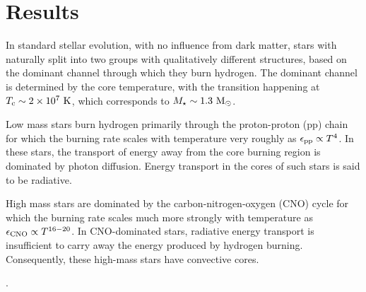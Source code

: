 \documentclass[useAMS,usenatbib]{mnras}
\begin{document}

  
  


\section{Results}
\label{sec:results}

In standard stellar evolution, with no influence from dark matter, stars with \mrange naturally split into two groups with qualitatively different structures, based on the dominant channel through which they burn hydrogen. The dominant channel is determined by the core temperature, with the transition happening at $T_\mathrm{c} \sim 2 \times 10^7 \ \mathrm{K}$, which corresponds to $M_{\star} \sim1.3 \ \mathrm{M}_{\odot}$.

Low mass stars burn hydrogen primarily through the proton-proton (pp) chain for which the burning rate scales with temperature very roughly as $\epsilon_{\mathrm{pp}} \propto T^4$. In these stars, the transport of energy away from the core burning region is dominated by photon diffusion. Energy transport in the cores of such stars is said to be radiative.

High mass stars are dominated by the carbon-nitrogen-oxygen (CNO) cycle for which the burning rate scales much more strongly with temperature as $\epsilon_{\mathrm{CNO}} \propto T^{16-20}$. In CNO-dominated stars, radiative energy transport is insufficient to carry away the energy produced by hydrogen burning. Consequently, these high-mass stars have convective cores.

.
\end{document}
